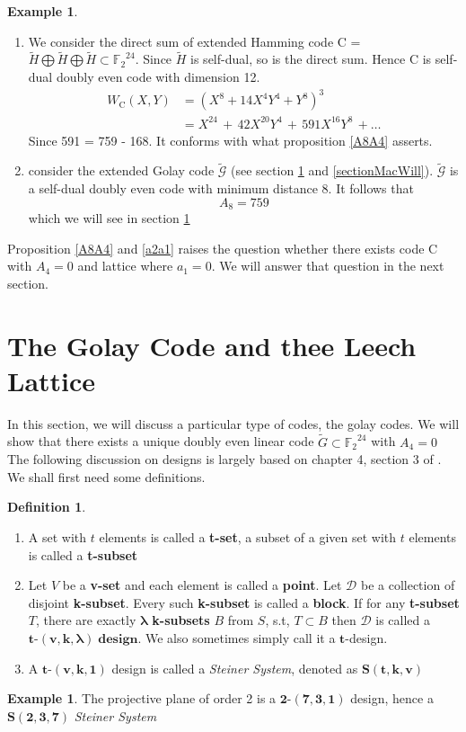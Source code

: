 \documentclass[12pt]{article}
\theoremstyle{definition}
\newtheorem{definition}[theorem]{Definition}
\newtheorem{example}[theorem]{Example}
\numberwithin{equation}{theorem}
\numberwithin{figure}{theorem}
\newcommand{\GExtend}{\ensuremath{\widetilde{G}}}
\newcommand{\Ftwo}{\ensuremath{\mathbb{F}_2}}
\newcommand{\tCompleteDesign}{\ensuremath{\bm{t\mbox{-}(v,k,\lambda)\; design}}}
\newcommand{\dDes}{\ensuremath{\mathcal{D}}}
\newcommand{\cCodes}{\ensuremath{\widetilde{\mathcal{G}}}}
\newcommand{\simpleCodes}{\ensuremath{\mathrm{C}}}
\newcommand{\weightEnumerator}[3]{\ensuremath{W_{#1}(#2,#3)}}
\begin{document}
\begin{example}\label{exampleA8A4}
\begin{enumerate}
	\item
We consider the direct sum of extended Hamming code {\simpleCodes} = $\widetilde{H} \bigoplus \widetilde{H} \bigoplus \widetilde{H} \subset \Ftwo^{24}$. Since $\widetilde{H}$ is self-dual, so is the direct sum. Hence {\simpleCodes} is self-dual doubly even code with dimension 12.\\
\begin{align*}
	\weightEnumerator{\simpleCodes}{X}{Y} &= (X^8 + 14X^4Y^4 + Y^8)^3 \\
	&= X^{24} \,+\, 42X^{20}Y^4 \,+\, 591X^{16}Y^8 \, + \ldots
\end{align*}
Since 591 = 759 - 168. It conforms with what proposition \ref{A8A4} asserts.
\item
consider the extended Golay code {\cCodes} (see section \ref{golaySection} and \ref{sectionMacWill}).  {\cCodes} is a self-dual doubly even code with minimum distance 8. It follows that
\[
	A_8 = 759
\]
which we will see in section \ref{golaySection}
\end{enumerate}
\end{example}
Proposition \ref{A8A4} and \ref{a2a1} raises the question whether there exists code $\simpleCodes$ with $A_4 = 0$ and lattice where $a_1 = 0$. We will answer that question in the next section.
\newpage
\section{The Golay Code and thee Leech Lattice}\label{golaySection}
In this section, we will discuss a particular type of codes, the golay codes. We will show that there exists a unique doubly even linear code  $\GExtend \subset \Ftwo^{24}$ with $A_4 = 0$ 
The following discussion on designs is largely based on chapter 4, section 3 of \cite{roman1992coding}.\\
We shall first need some definitions.
\begin{definition}\label{designDef} \hfill
	\begin{enumerate}
		\item A set with $t$ elements is called a \textbf{t-set}, a subset of a given set with $t$ elements is called a \textbf{t-subset}
		\item Let $V$ be a \textbf{v-set} and each element is called a \textbf{point}. Let {\dDes} be a collection of disjoint \textbf{k-subset}. Every such \textbf{k-subset} is called a \textbf{block}. If for any \textbf{t-subset} $T$, there are exactly $\mathbf{\lambda}$ \textbf{k-subsets} $B$ from $S$, s.t, $T \subset B$ then {\dDes} is called a \tCompleteDesign . We also sometimes simply call it a $\bm{t}$-design.
		\item A $\bm{t\mbox{-}(v,k,1)}$ design is called a \emph{Steiner System}, denoted as $\bm{S(t,k,v)}$
	\end{enumerate}
\end{definition}
\begin{example}\label{projPlane}
		The projective plane of order 2 is a $\bm{2\mbox{-}(7,3,1)}$ design, hence a $\bm{S(2,3,7)}$ \emph{Steiner System}
\end{example}
\end{document}
